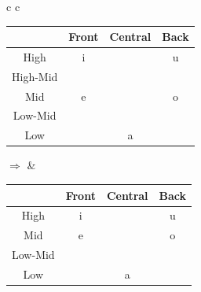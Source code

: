 \documentclass{report}[12pt]
\begin{document}
\begin{tcolorbox}
  \begin{tabular}{c c}
    \begin{tabular}{|c|c|c|c|}
      \hline
      & Front & Central & Back \\
      \hline
      High & i & & u \\
      \hline
      High-Mid & \cellcolor{gray} \textipa{I} & & \cellcolor{gray} \textipa{U} \\
      \hline
      Mid & e & & o \\
      \hline
      Low-Mid & \textipa{E} & & \textipa{O} \\
      \hline
      Low & & a & \\
      \hline
    \end{tabular}
    \quad $\Rightarrow$ &
                          \begin{tabular}{|c|c|c|c|}
                            \hline
                            & Front & Central & Back \\
                            \hline
                            High & i & & u \\
                            \hline
                            Mid & \cellcolor{magenta} e & & \cellcolor{magenta} o \\
                            \hline
                            Low-Mid & \textipa{E} & & \textipa{O} \\
                            \hline
                            Low & & a & \\
                            \hline
                          \end{tabular}
  \end{tabular}
\end{tcolorbox}
\end{document}
